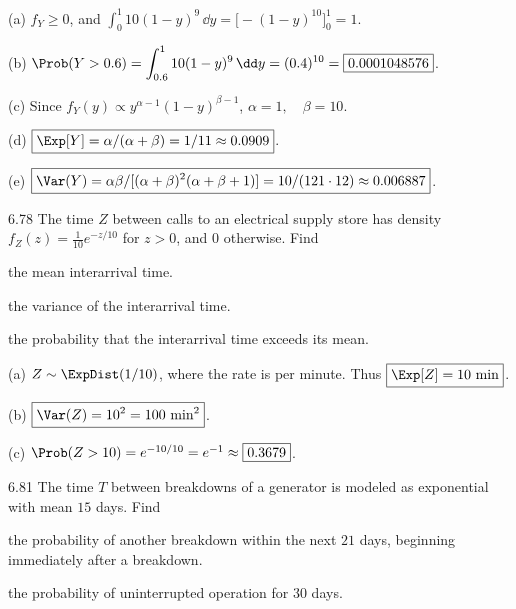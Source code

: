 \documentclass[11pt,oneside]{article}
\begin{document}
\begin{solution}
\noindent\textup{(a)} $f_Y\ge0$, and $\displaystyle\int_0^1 10(1-y)^9\,\dd y=\bigl[-(1-y)^{10}\bigr]_0^1=1$.

\noindent\textup{(b)} $\Prob(Y>0.6)=\displaystyle\int_{0.6}^1 10(1-y)^9\,\dd y=(0.4)^{10}=\boxed{0.0001048576}$.

\noindent\textup{(c)} Since $f_Y(y)\propto y^{\alpha-1}(1-y)^{\beta-1}$, $\boxed{\alpha=1,\quad\beta=10}$.

\noindent\textup{(d)} $\boxed{\Exp[Y]=\alpha/(\alpha+\beta)=1/11\approx0.0909}$.

\noindent\textup{(e)} $\boxed{\Var(Y)=\alpha\beta/[(\alpha+\beta)^2(\alpha+\beta+1)]=10/(121\cdot12)\approx0.006887}$.
\end{solution}

\begin{exercise}{6.78}
The time $Z$ between calls to an electrical supply store has density $f_Z(z)=\frac1{10}e^{-z/10}$ for $z>0$, and $0$ otherwise. Find
\begin{exercisesubparts}
\item the mean interarrival time.
\item the variance of the interarrival time.
\item the probability that the interarrival time exceeds its mean.
\end{exercisesubparts}
\end{exercise}

\begin{solution}
\noindent\textup{(a)} $Z\sim\ExpDist(1/10)$, where the rate is per minute. Thus $\boxed{\Exp[Z]=10\text{ min}}$.

\noindent\textup{(b)} $\boxed{\Var(Z)=10^2=100\text{ min}^2}$.

\noindent\textup{(c)} $\Prob(Z>10)=e^{-10/10}=e^{-1}\approx\boxed{0.3679}$.
\end{solution}

\begin{exercise}{6.81}
The time $T$ between breakdowns of a generator is modeled as exponential with mean $15$ days. Find
\begin{exercisesubparts}
\item the probability of another breakdown within the next $21$ days, beginning immediately after a breakdown.
\item the probability of uninterrupted operation for $30$ days.
\end{exercisesubparts}
\end{exercise}
\end{document}
